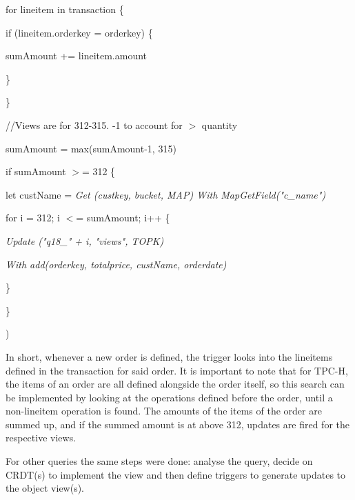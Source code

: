 \documentclass{vldb}
\newcommand{\emphvspace}{0.5\baselineskip}
\newcommand{\lastblockemph}[1]{\hspace{2em}\emph{#1}\vspace{\emphvspace}}
\begin{document}
\hspace{2.5em}for lineitem in transaction \{

\hspace{3.5em}if (lineitem.orderkey = orderkey) \{
			
\hspace{4.5em}sumAmount += lineitem.amount
		
\hspace{3.5em}\}

\hspace{2.5em}\}

\hspace{2.5em}//Views are for 312-315. -1 to account for $>$ quantity

\hspace{2.5em}sumAmount = max(sumAmount-1, 315)

\hspace{2.5em}if sumAmount $>$= 312 \{

\hspace{3.5em}let custName = \emph{Get (custkey, bucket, MAP) With MapGetField("c\_name")}

\hspace{3.5em}for i = 312; i $<$= sumAmount; i++ \{

\hspace{4.5em}\emph{Update ("q18\_" + i, "views", TOPK)}

\hspace{4.5em}\emph{With add(orderkey, totalprice, custName, orderdate)}

\hspace{3.5em}\}
	
\hspace{2.5em}\}

\lastblockemph{\hspace{-1.5em}})

In short, whenever a new order is defined, the trigger looks into the lineitems defined in the transaction for said order.
It is important to note that for TPC-H, the items of an order are all defined alongside the order itself, so this search can be implemented by looking at the operations defined before the order, until a non-lineitem operation is found.
The amounts of the items of the order are summed up, and if the summed amount is at above 312, updates are fired for the respective views.

For other queries the same steps were done: analyse the query, decide on CRDT(s) to implement the view and then define triggers to generate updates to the object view(s).
\end{document}
